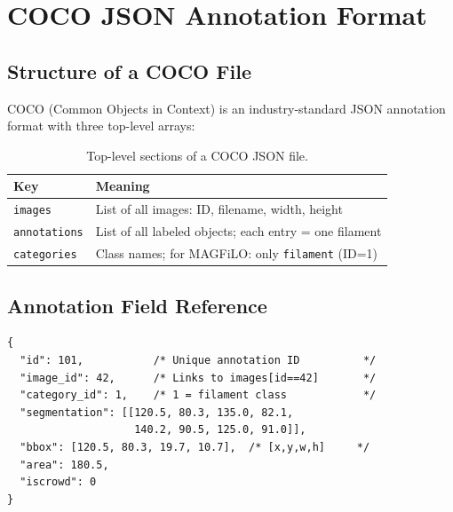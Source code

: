 \documentclass[12pt,a4paper,openany]{report}
\begin{document}
\chapter{COCO JSON Annotation Format}

\section{Structure of a COCO File}

COCO (Common Objects in Context) is an industry-standard JSON annotation format
with three top-level arrays:

\begin{table}[H]
\centering
\caption{Top-level sections of a COCO JSON file.}
\renewcommand{\arraystretch}{1.3}
\begin{tabular}{l p{9cm}}
\toprule
\textbf{Key} & \textbf{Meaning} \\
\midrule
\texttt{images}      & List of all images: ID, filename, width, height \\
\texttt{annotations} & List of all labeled objects; each entry = one filament \\
\texttt{categories}  & Class names; for MAGFiLO: only \texttt{filament} (ID=1) \\
\bottomrule
\end{tabular}
\label{tab:coco_top}
\end{table}

\section{Annotation Field Reference}

\begin{lstlisting}[caption={Complete COCO annotation entry example.}]
{
  "id": 101,           /* Unique annotation ID          */
  "image_id": 42,      /* Links to images[id==42]       */
  "category_id": 1,    /* 1 = filament class            */
  "segmentation": [[120.5, 80.3, 135.0, 82.1,
                    140.2, 90.5, 125.0, 91.0]],
  "bbox": [120.5, 80.3, 19.7, 10.7],  /* [x,y,w,h]     */
  "area": 180.5,
  "iscrowd": 0
}
\end{lstlisting}
\end{document}
